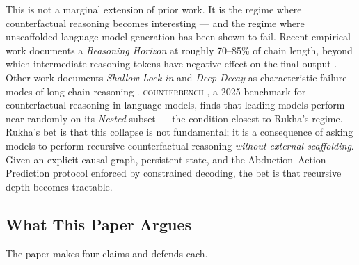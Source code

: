 \documentclass[11pt]{article}
\theoremstyle{rukha}
\begin{document}
This is not a marginal extension of prior work. It is the regime where
counterfactual reasoning becomes interesting --- and the regime where
unscaffolded language-model generation has been shown to fail. Recent
empirical work documents a \emph{Reasoning Horizon} at roughly
\mbox{70–85\%} of chain length, beyond which intermediate reasoning
tokens have negative effect on the final output \cite{faithfulnessdecay}.
Other work documents \emph{Shallow Lock-in} and \emph{Deep Decay} as
characteristic failure modes of long-chain reasoning
\cite{stepflowbreaks}. \textsc{counterbench} \cite{counterbench}, a 2025
benchmark for counterfactual reasoning in language models, finds that
leading models perform near-randomly on its \emph{Nested} subset --- the
condition closest to Rukha's regime. Rukha's bet is that this collapse is
not fundamental; it is a consequence of asking models to perform
recursive counterfactual reasoning \emph{without external scaffolding}.
Given an explicit causal graph, persistent state, and the
Abduction–Action–Prediction protocol enforced by constrained decoding,
the bet is that recursive depth becomes tractable.

\subsection{What This Paper Argues}

The paper makes four claims and defends each.
\end{document}
